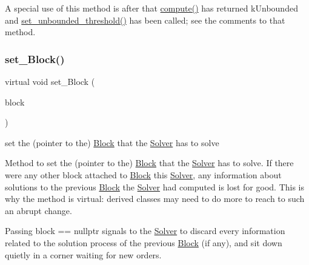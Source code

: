 A special use of this method is after that \mbox{\hyperlink{class_s_m_spp__di__unipi__it_1_1_solver_a504d4e3e174c7a518cc66156a8a45ce5}{compute()}} has returned k\+Unbounded and \mbox{\hyperlink{class_s_m_spp__di__unipi__it_1_1_solver_ae1717d1363782e086aa797e7437c0352}{set\+\_\+unbounded\+\_\+threshold()}} has been called; see the comments to that method. \mbox{\label{class_s_m_spp__di__unipi__it_1_1_solver_a73965be2cfab47947f0166116bf4a3cc}} 
\subsubsection{\texorpdfstring{set\+\_\+\+Block()}{set\_Block()}}
{\footnotesize\ttfamily virtual void set\+\_\+\+Block (\begin{DoxyParamCaption}\item[{\mbox{\hyperlink{class_s_m_spp__di__unipi__it_1_1_block}{Block}} $\ast$}]{block }\end{DoxyParamCaption})\hspace{0.3cm}{\ttfamily [virtual]}}



set the (pointer to the) \mbox{\hyperlink{class_s_m_spp__di__unipi__it_1_1_block}{Block}} that the \mbox{\hyperlink{class_s_m_spp__di__unipi__it_1_1_solver}{Solver}} has to solve 

Method to set the (pointer to the) \mbox{\hyperlink{class_s_m_spp__di__unipi__it_1_1_block}{Block}} that the \mbox{\hyperlink{class_s_m_spp__di__unipi__it_1_1_solver}{Solver}} has to solve. If there were any other block attached to \mbox{\hyperlink{class_s_m_spp__di__unipi__it_1_1_block}{Block}} this \mbox{\hyperlink{class_s_m_spp__di__unipi__it_1_1_solver}{Solver}}, any information about solutions to the previous \mbox{\hyperlink{class_s_m_spp__di__unipi__it_1_1_block}{Block}} the \mbox{\hyperlink{class_s_m_spp__di__unipi__it_1_1_solver}{Solver}} had computed is lost for good. This is why the method is virtual\+: derived classes may need to do more to reach to such an abrupt change.

Passing block == nullptr signals to the \mbox{\hyperlink{class_s_m_spp__di__unipi__it_1_1_solver}{Solver}} to discard every information related to the solution process of the previous \mbox{\hyperlink{class_s_m_spp__di__unipi__it_1_1_block}{Block}} (if any), and sit down quietly in a corner waiting for new orders. 

